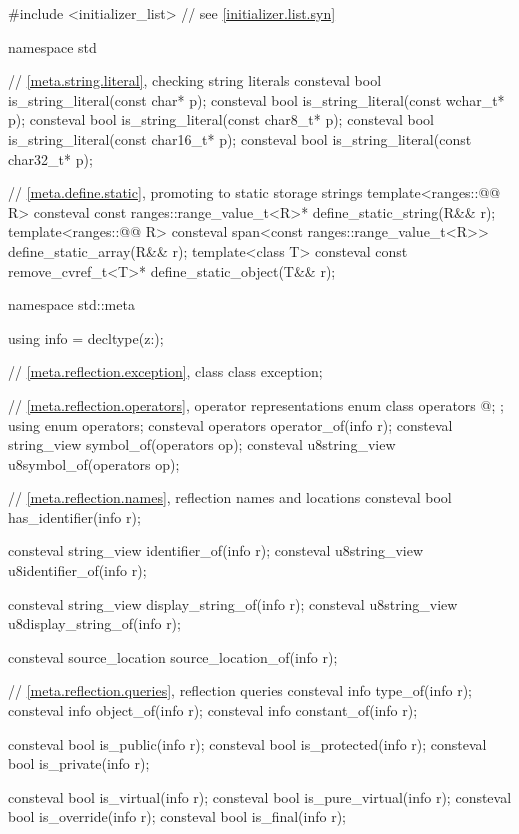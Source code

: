%
\begin{codeblock}
#include <initializer_list>     // see \ref{initializer.list.syn}

namespace std {
  // \ref{meta.string.literal}, checking string literals
  consteval bool is_string_literal(const char* p);
  consteval bool is_string_literal(const wchar_t* p);
  consteval bool is_string_literal(const char8_t* p);
  consteval bool is_string_literal(const char16_t* p);
  consteval bool is_string_literal(const char32_t* p);

  // \ref{meta.define.static}, promoting to static storage strings
  template<ranges::@@ R>
    consteval const ranges::range_value_t<R>* define_static_string(R&& r);
  template<ranges::@@ R>
    consteval span<const ranges::range_value_t<R>> define_static_array(R&& r);
  template<class T>
    consteval const remove_cvref_t<T>* define_static_object(T&& r);
}

namespace std::meta {
  using info = decltype(^^::);

  // \ref{meta.reflection.exception}, class 
  class exception;

  // \ref{meta.reflection.operators}, operator representations
  enum class operators {
    @\seebelow@;
  };
  using enum operators;
  consteval operators operator_of(info r);
  consteval string_view symbol_of(operators op);
  consteval u8string_view u8symbol_of(operators op);

  // \ref{meta.reflection.names}, reflection names and locations
  consteval bool has_identifier(info r);

  consteval string_view identifier_of(info r);
  consteval u8string_view u8identifier_of(info r);

  consteval string_view display_string_of(info r);
  consteval u8string_view u8display_string_of(info r);

  consteval source_location source_location_of(info r);

  // \ref{meta.reflection.queries}, reflection queries
  consteval info type_of(info r);
  consteval info object_of(info r);
  consteval info constant_of(info r);

  consteval bool is_public(info r);
  consteval bool is_protected(info r);
  consteval bool is_private(info r);

  consteval bool is_virtual(info r);
  consteval bool is_pure_virtual(info r);
  consteval bool is_override(info r);
  consteval bool is_final(info r);

}
\end{codeblock}
